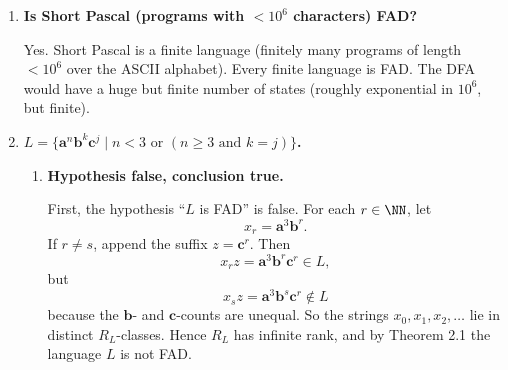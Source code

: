 \begin{enumerate}[{2.}1.]
No.
We use a Chapter 2 distinct-futures argument: matching nested \texttt{begin}/\texttt{end} blocks requires arbitrarily many different continuations.

For each $n\geq 1$, let $x_n$ be the ASCII string
\[
\texttt{program p; begin begin ... begin }
\]
with exactly $n$ occurrences of the keyword \texttt{begin}, and let $z_n$ be the ASCII string
\[
\texttt{end end ... end.}
\]
with exactly $n$ occurrences of the keyword \texttt{end}.

Then $x_nz_n$ is a valid Pascal program: after the header \texttt{program p;}, the body is a nested compound statement with $n$ occurrences of \texttt{begin} followed by the matching $n$ occurrences of \texttt{end}, and then the final period.

If $m\neq n$, then $x_mz_n$ is not a valid Pascal program. If $m<n$, there are too many \texttt{end}s; if $m>n$, there are unmatched \texttt{begin}s left over before the final period.

Therefore $x_n$ and $x_m$ have different futures with respect to the language Pascal, since
\[
x_nz_n\in\text{Pascal}\qquad\text{but}\qquad x_mz_n\notin\text{Pascal}\ \ (m\neq n).
\]
So the strings $x_1,x_2,x_3,\ldots$ lie in distinct $R_{\text{Pascal}}$-classes. Hence $R_{\text{Pascal}}$ has infinitely many equivalence classes, and Pascal is not FAD.

\item \textbf{Is Short Pascal (programs with $<10^6$ characters) FAD?}

Yes. Short Pascal is a finite language (finitely many programs of length $<10^6$ over the ASCII alphabet). Every finite language is FAD. The DFA would have a huge but finite number of states (roughly exponential in $10^6$, but finite).

\item \textbf{$L=\{\mathbf{a}^n\mathbf{b}^k\mathbf{c}^j\mid n<3\text{ or }(n\geq 3\text{ and }k=j)\}$.}

\begin{enumerate}
\item \textbf{Hypothesis false, conclusion true.}

First, the hypothesis ``$L$ is FAD'' is false. For each $r\in\NN$, let
\[
x_r=\mathbf a^3\mathbf b^r.
\]
If $r\neq s$, append the suffix $z=\mathbf c^r$. Then
\[
x_rz=\mathbf a^3\mathbf b^r\mathbf c^r\in L,
\]
but
\[
x_sz=\mathbf a^3\mathbf b^s\mathbf c^r\notin L
\]
because the $\mathbf b$- and $\mathbf c$-counts are unequal.
So the strings $x_0,x_1,x_2,\ldots$ lie in distinct $R_L$-classes.
Hence $R_L$ has infinite rank, and by Theorem 2.1 the language $L$ is not FAD.


\end{enumerate}
\end{enumerate}
